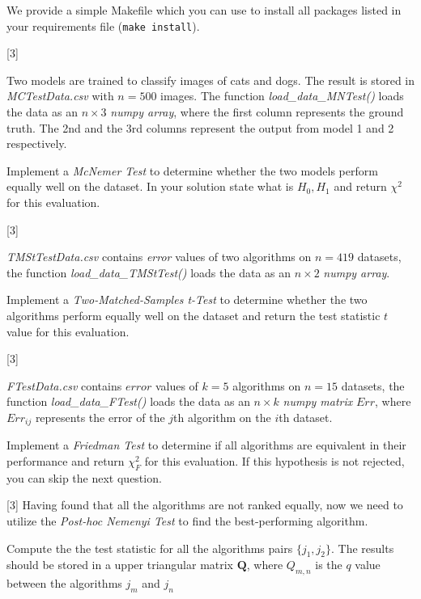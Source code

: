 \documentclass{exam}
\begin{document}
	\bigskip
	
	
	\noindent We provide a simple Makefile which you can use to install all packages listed in your requirements file (\texttt{make install}).
	
	
	\begin{questions}
		
		
		[3]
		
		Two models are trained to classify images of cats and dogs. The result is stored in \textit{MCTestData.csv} with $n=500$ images. The function \textit{load\_data\_MNTest()} loads the data as an $n\times 3$ \textit{numpy array}, where the first column represents the ground truth. The 2nd and the 3rd columns represent the output from model 1 and 2 respectively.
		 
		Implement a \textit{McNemer Test} to determine whether the two models perform equally well on the dataset. In your solution state what is $H_0, H_1$ and return $\chi^2$ for this evaluation.
		
		
		[3]
		
		\textit{TMStTestData.csv} contains \textit{error} values of two algorithms on $n=419$ datasets, the function \textit{load\_data\_TMStTest()} loads the data as an $n\times 2$ \textit{numpy array}.
		
		Implement a \textit{Two-Matched-Samples t-Test} to determine whether the two algorithms perform equally well on the dataset and return the test statistic $t$ value for this evaluation.
		
		[3]
		
		\textit{FTestData.csv} contains $error$ values of $k=5$ algorithms on $n=15$ datasets, the function \textit{load\_data\_FTest()} loads the data as an $n\times k$ \textit{numpy matrix} $Err$, where $Err_{ij}$ represents the error of the $j$th algorithm on the $i$th dataset.
		
		Implement a \textit{Friedman Test} to determine if all algorithms are equivalent in their performance and return $\chi_F^2$ for this evaluation.  If this hypothesis is not rejected, you can skip the next question. 
		
		[3]
		Having found that all the algorithms are not ranked equally, now we need to utilize the \textit{Post-hoc Nemenyi Test} to find the best-performing algorithm.
		
		Compute the the test statistic for all the algorithms pairs $\{j_1,j_2\}$. The results should be stored in a upper triangular matrix $\mathbf{Q}$, where $Q_{m,n}$ is the $q$ value between the algorithms $j_m$ and $j_n$ 
		

\end{questions}
\end{document}
